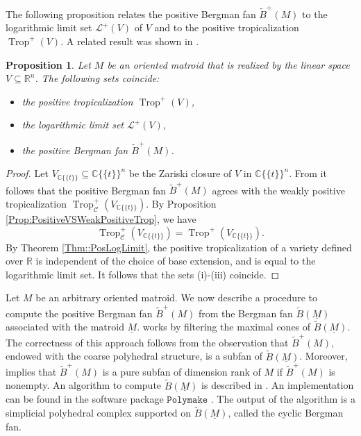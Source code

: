 \documentclass{article}
\newtheorem{proposition}[theorem]{Proposition}
\theoremstyle{definition}
\DeclareMathOperator{\Trop}{Trop}
\newcommand{\R}{\mathbb{R}}
\newcommand{\CC}{\mathcal{C}}
\newcommand{\LL}{\mathcal{L}}
\begin{document}
The following proposition relates the positive Bergman fan $\widetilde{B}^+(M)$ to the logarithmic limit set $\LL^+(V)$ of $V$ and to the positive tropicalization $\Trop^+(V)$.
A related result was shown in \cite[Theorem 3.14]{Tabera::Bases}.
\begin{proposition}
Let $M$ be an oriented matroid that is realized by the linear space
$V\subseteq \R^n$. The following sets coincide:
\begin{itemize}
    \item[(i)] the positive tropicalization $\Trop^+(V)$,
     \item[(ii)] the logarithmic limit set $\LL^+(V)$,
    \item[(iii)] the positive Bergman fan $\widetilde{B}^+(M)$.
\end{itemize}
    \end{proposition}
\begin{proof}
Let $V_{\mathbb{C}\{\!\{t \}\!\}} \subseteq \mathbb{C}\{\!\{t \}\!\}^n$ be the Zariski closure of $V$ in $\mathbb{C}\{\!\{t \}\!\}^n$. From \cite[Proposition 4.1]{ARDILA2006577} it follows that the positive Bergman fan $\widetilde{B}^+(M)$ agrees with the weakly positive tropicalization $\Trop_\CC^+(V_{\mathbb{C}\{\!\{t \}\!\}})$. By Proposition \ref{Prop:PositiveVSWeakPositiveTrop}, we have 
\[\Trop^+_\CC(V_{\mathbb{C}\{\!\{t \}\!\}}) = \Trop^+(V_{\mathbb{C}\{\!\{t \}\!\}}). \]
By Theorem \ref{Thm::PosLogLimit}, the positive tropicalization of a variety defined over $\mathbb{R}$ is independent of the choice of base extension, and is equal to the logarithmic limit set. It follows that the sets (i)-(iii) coincide.
\end{proof}


Let $M$ be an arbitrary oriented matroid.
We now describe a procedure to compute 
the positive Bergman fan $\widetilde{B}^+(M)$ from the Bergman fan $\widetilde{B}(\underline{M})$ associated with the matroid $\underline{M}$.  works by filtering the maximal cones of $\widetilde{B}(\underline{M})$.
The correctness of this approach follows from the observation that $\widetilde{B}^+(M)$, endowed with the coarse polyhedral structure, is a subfan of $\widetilde{B}(\underline{M})$.
Moreover, \cite[Corollary 5.3]{ARDILA2006577}  implies that $\widetilde{B}^+(M)$ is a pure subfan of dimension rank of $M$ if $\widetilde{B}^+(M)$ is nonempty.
An algorithm to compute $\widetilde{B}(\underline{M})$
is described in 
\cite{RinconComputingTropicalLinearSpaces}.
An implementation can be found in the software package $\texttt{Polymake}$ \cite{POLYMAKE}. 
The output of the algorithm is a simplicial polyhedral complex supported on $\widetilde{B}(\underline{M})$, called the cyclic Bergman fan.
\end{document}
